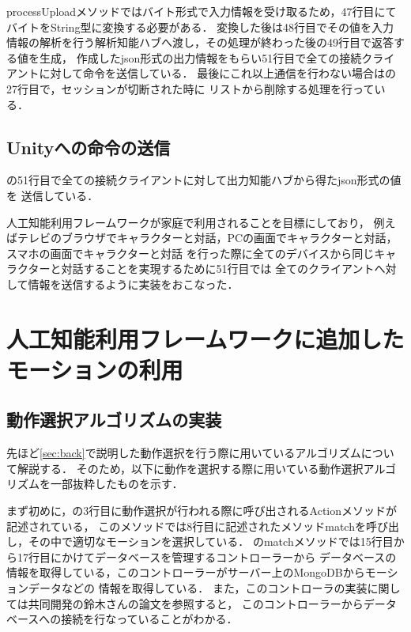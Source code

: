 processUploadメソッドではバイト形式で入力情報を受け取るため，47行目にてバイトをString型に変換する必要がある．
変換した後は48行目でその値を入力情報の解析を行う解析知能ハブへ渡し，その処理が終わった後の49行目で返答する値を生成，
作成したjson形式の出力情報をもらい51行目で全ての接続クライアントに対して命令を送信している．
最後にこれ以上通信を行わない場合はの27行目で，セッションが切断された時に
リストから削除する処理を行っている．

\subsection{Unityへの命令の送信}
の51行目で全ての接続クライアントに対して出力知能ハブから得たjson形式の値を
送信している．

人工知能利用フレームワークが家庭で利用されることを目標にしており，
例えばテレビのブラウザでキャラクターと対話，PCの画面でキャラクターと対話，スマホの画面でキャラクターと対話
を行った際に全てのデバイスから同じキャラクターと対話することを実現するために51行目では
全てのクライアントへ対して情報を送信するように実装をおこなった．


\section{人工知能利用フレームワークに追加したモーションの利用}\label{sec:motion}
\subsection{動作選択アルゴリズムの実装}
先ほど\ref{sec:back}で説明した動作選択を行う際に用いているアルゴリズムについて解説する．
そのため，以下に動作を選択する際に用いている動作選択アルゴリズムを一部抜粋したものを示す．


まず初めに，の3行目に動作選択が行われる際に呼び出されるActionメソッドが記述されている，
このメソッドでは8行目に記述されたメソッドmatchを呼び出し，その中で適切なモーションを選択している．
のmatchメソッドでは15行目から17行目にかけてデータベースを管理するコントローラーから
データベースの情報を取得している，このコントローラーがサーバー上のMongoDBからモーションデータなどの
情報を取得している．
また，このコントローラの実装に関しては共同開発の鈴木さんの論文\cite{suzuki}を参照すると，
このコントローラーからデータベースへの接続を行なっていることがわかる．

